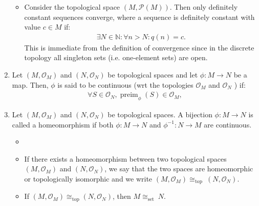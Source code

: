 \documentclass{article}
\begin{document}
\begin{enumerate}
\begin{itemize}
    \item Consider the topological space $(M, \mathcal{P}(M))$. Then only definitely constant sequences converge, where a sequence is definitely constant with value $c \in M$ if:
\begin{align*}
\exists N \in \mathbb{N}: \forall n>N: q(n)=c .
\end{align*}
This is immediate from the definition of convergence since in the discrete topology all singleton sets (i.e. one-element sets) are open.
\end{itemize}
\item {} Let $\left(M, \mathcal{O}_{M}\right)$ and $\left(N, \mathcal{O}_{N}\right)$ be topological spaces and let $\phi: M \rightarrow N$ be a map. Then, $\phi$ is said to be continuous (\gls{wrt} the topologies $\mathcal{O}_{M}$ and $\mathcal{O}_{N}$ ) if:
\begin{align*}
\forall S \in \mathcal{O}_{N}, \operatorname{preim}_{\phi}(S) \in \mathcal{O}_{M},
\end{align*}

\item {}  Let $\left(M, \mathcal{O}_{M}\right)$ and $\left(N, \mathcal{O}_{N}\right)$ be topological spaces. A bijection $\phi: M \rightarrow N$ is called a homeomorphism if both $\phi: M \rightarrow N$ and $\phi^{-1}: N \rightarrow M$ are continuous.
\begin{itemize}
    \item {}
    \item If there exists a homeomorphism between two topological spaces $\left(M, \mathcal{O}_{M}\right)$ and $\left(N, \mathcal{O}_{N}\right)$, we say that the two spaces are homeomorphic or topologically isomorphic and we write $\left(M, \mathcal{O}_{M}\right) \cong_{\text {top }}\left(N, \mathcal{O}_{N}\right)$.
    \item If $\left(M, \mathcal{O}_{M}\right) \cong_{\text{top}} \left(N, \mathcal{O}_{N}\right)$, then $M\cong_{\text {set }} N$.
\end{itemize} 
\end{enumerate}
\end{document}
